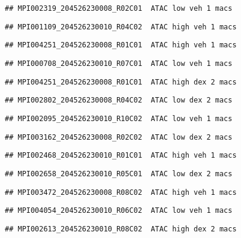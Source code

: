 \documentclass[
]{article}
\begin{document}
\begin{verbatim}
## MPI002319_204526230008_R02C01  ATAC low veh 1 macs
\end{verbatim}

\begin{verbatim}
## MPI001109_204526230010_R04C02  ATAC high veh 1 macs
\end{verbatim}

\begin{verbatim}
## MPI004251_204526230008_R01C01  ATAC high veh 1 macs
\end{verbatim}

\begin{verbatim}
## MPI000708_204526230010_R07C01  ATAC low veh 1 macs
\end{verbatim}

\begin{verbatim}
## MPI004251_204526230008_R01C01  ATAC high dex 2 macs
\end{verbatim}

\begin{verbatim}
## MPI002802_204526230008_R04C02  ATAC low dex 2 macs
\end{verbatim}

\begin{verbatim}
## MPI002095_204526230010_R10C02  ATAC low veh 1 macs
\end{verbatim}

\begin{verbatim}
## MPI003162_204526230008_R02C02  ATAC low dex 2 macs
\end{verbatim}

\begin{verbatim}
## MPI002468_204526230010_R01C01  ATAC high veh 1 macs
\end{verbatim}

\begin{verbatim}
## MPI002658_204526230010_R05C01  ATAC low dex 2 macs
\end{verbatim}

\begin{verbatim}
## MPI003472_204526230008_R08C02  ATAC high veh 1 macs
\end{verbatim}

\begin{verbatim}
## MPI004054_204526230010_R06C02  ATAC low veh 1 macs
\end{verbatim}

\begin{verbatim}
## MPI002613_204526230010_R08C02  ATAC high dex 2 macs
\end{verbatim}
\end{document}

